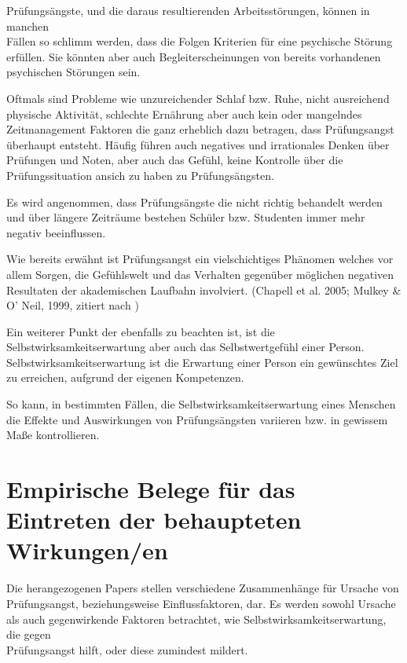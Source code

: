 \documentclass[11pt, a4paper]{article}
\begin{document}
Prüfungsängste, und die daraus resultierenden Arbeitsstörungen, können in manchen\\ Fällen so schlimm werden, dass die Folgen Kriterien für eine psychische Störung erfüllen. Sie könnten aber auch Begleiterscheinungen von bereits vorhandenen psychischen Störungen sein. \cite{Holm-Hadulla2009}

Oftmals sind Probleme wie unzureichender Schlaf bzw. Ruhe, nicht ausreichend physische Aktivität, schlechte Ernährung aber auch kein oder mangelndes Zeitmanagement Faktoren die ganz erheblich dazu betragen, dass Prüfungsangst überhaupt entsteht. Häufig führen auch negatives und irrationales Denken über Prüfungen und Noten, aber auch das Gefühl, keine Kontrolle über die Prüfungssituation ansich zu haben zu Prüfungsängsten. \cite{hashmat2008factors}

Es wird angenommen, dass Prüfungsängste die nicht richtig behandelt werden und über längere Zeiträume bestehen Schüler bzw. Studenten immer mehr negativ beeinflussen. 

Wie bereits erwähnt ist Prüfungsangst ein vielschichtiges Phänomen welches vor allem Sorgen, die Gefühlswelt und das Verhalten gegenüber möglichen negativen Resultaten der akademischen Laufbahn involviert. (Chapell et al. 2005; Mulkey \& O’ Neil, 1999, zitiert nach \cite{barrows2013anxiety})

Ein weiterer Punkt der ebenfalls zu beachten ist, ist die Selbstwirksamkeitserwartung aber auch das Selbstwertgefühl einer Person. Selbstwirksamkeitserwartung ist die Erwartung einer Person ein gewünschtes Ziel zu erreichen, aufgrund der eigenen Kompetenzen.

So kann, in bestimmten Fällen, die Selbstwirksamkeitserwartung eines Menschen die Effekte und Auswirkungen von Prüfungsängsten variieren bzw. in gewissem Maße kontrollieren. \cite{barrows2013anxiety}

\newpage
\section*{Empirische Belege für das Eintreten der behaupteten Wirkungen/en}

	Die herangezogenen Papers stellen verschiedene Zusammenhänge für Ursache von \\Prüfungsangst, beziehungsweise Einflussfaktoren, dar. Es werden sowohl Ursache als auch gegenwirkende Faktoren betrachtet, wie Selbstwirksamkeitserwartung, die gegen \\Prüfungsangst hilft, oder diese zumindest mildert.
\end{document}
